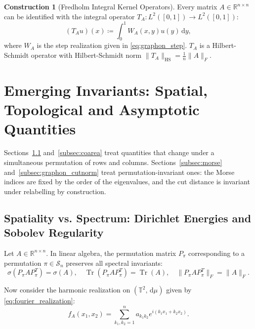 \documentclass[11pt,a4paper,reqno]{amsart}
\theoremstyle{definition}
\newtheorem{construction}[theorem]{Construction}
\numberwithin{equation}{section}
\newcommand{\R}{\mathbb{R}}
\newcommand{\Tor}{\mathbb{T}}
\newcommand{\Tr}{\operatorname{Tr}}
\newcommand{\dif}{\,\mathrm{d}}
\begin{document}
\begin{construction}[Fredholm Integral Kernel Operators]
Every matrix $A \in \R^{n \times n}$ can be identified with the integral operator $T_A \colon L^2([0, 1]) \to L^2([0, 1])$:
\begin{equation}
    (T_A u)(x) \coloneqq \int_0^1 W_A(x, y) u(y) \dif y,
\end{equation}
where $W_A$ is the step realization given in \eqref{eq:graphon_step}. $T_A$ is a Hilbert-Schmidt operator with Hilbert-Schmidt norm $\|T_A\|_{\mathrm{HS}} = \frac{1}{n} \|A\|_F$.
\end{construction}

\section{Emerging Invariants: Spatial, Topological and Asymptotic Quantities}
\label{sec:emerging_invariants}

Sections~\ref{subsec:sobolev} and~\ref{subsec:coarea} treat quantities that change under a simultaneous permutation of rows and columns. Sections~\ref{subsec:morse} and~\ref{subsec:graphon_cutnorm} treat permutation-invariant ones: the Morse indices are fixed by the order of the eigenvalues, and the cut distance is invariant under relabelling by construction.

\subsection{Spatiality vs. Spectrum: Dirichlet Energies and Sobolev Regularity}
\label{subsec:sobolev}

Let $A \in \R^{n \times n}$. In linear algebra, the permutation matrix $P_\pi$ corresponding to a permutation $\pi \in \mathcal{S}_n$ preserves all spectral invariants:
\begin{equation}
    \sigma(P_\pi A P_\pi^T) = \sigma(A), \quad \Tr(P_\pi A P_\pi^T) = \Tr(A), \quad \|P_\pi A P_\pi^T\|_F = \|A\|_F.
\end{equation}

Now consider the harmonic realization on $(\Tor^2, \dif\mu)$ given by \eqref{eq:fourier_realization}:
\begin{equation}
    f_A(x_1, x_2) = \sum_{k_1, k_2 = 1}^n a_{k_1 k_2} e^{i (k_1 x_1 + k_2 x_2)}.
\end{equation}
\end{document}
